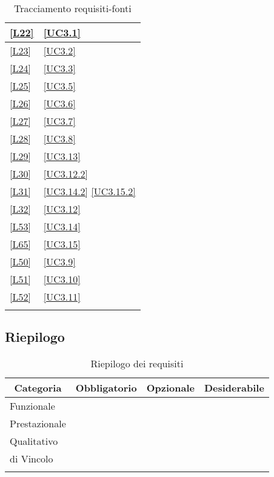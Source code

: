 \begin{longtable}{|P{6cm}|P{6cm}|}
	\hline \ref{L22} & \ref{UC3.1} \\
	\hline \ref{L23} & \ref{UC3.2} \\
	\hline \ref{L24} & \ref{UC3.3} \\
	\hline \ref{L25} & \ref{UC3.5} \\
	\hline \ref{L26} & \ref{UC3.6} \\
	\hline \ref{L27} & \ref{UC3.7} \\
	\hline \ref{L28} & \ref{UC3.8} \\
	\hline \ref{L29} & \ref{UC3.13} \\
	\hline \ref{L30} & \ref{UC3.12.2} \\
	\hline \ref{L31} & \ref{UC3.14.2} \linebreak \ref{UC3.15.2} \\
	\hline \ref{L32} & \ref{UC3.12} \\
	\hline \ref{L53} & \ref{UC3.14} \\
	\hline \ref{L65} & \ref{UC3.15} \\
	\hline \ref{L50} & \ref{UC3.9} \\
	\hline \ref{L51} & \ref{UC3.10} \\
	\hline \ref{L52} & \ref{UC3.11} \\	
	\hline
	\caption{Tracciamento requisiti-fonti}
\end{longtable}

\subsection{Riepilogo}

\begin{longtable}{|l|c|c|c|}
	\hline \multicolumn{1}{|c|}{\textbf{Categoria}} & \multicolumn{1}{c|}{\textbf{Obbligatorio}} & \multicolumn{1}{c|}{\textbf{Opzionale}} & \multicolumn{1}{c|}{\textbf{Desiderabile}} \\
	\endfirsthead
	\hline Funzionale & \thetotObF & \thetotOpF & \thetotDF \\
	\hline Prestazionale & \thetotObP & \thetotOpP & \thetotDP \\
	\hline Qualitativo & \thetotObQ & \thetotOpQ & \thetotDQ \\
	\hline di Vincolo & \thetotObV & \thetotOpV & \thetotDV \\
	\hline
	\caption{Riepilogo dei requisiti}
\end{longtable}
